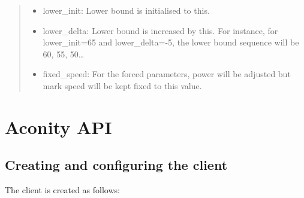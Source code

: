 \documentclass[letterpaper,10pt,english,openany,oneside]{sphinxmanual}
\begin{document}
\begin{itemize}
\begin{quote}
\begin{itemize}
\begin{itemize}
\item {} 
lower\_init: Lower bound is initialised to this.

\item {} 
lower\_delta: Lower bound is increased by this. For instance, for lower\_init=65 and lower\_delta=-5, the lower bound sequence will be 60, 55, 50…

\item {} 
fixed\_speed: For the forced parameters, power will be adjusted but mark speed will be kept fixed to this value.

\end{itemize}

\end{itemize}
\end{quote}

\end{itemize}


\chapter{Aconity API}
\label{\detokenize{aconityapi:aconity-api}}\label{\detokenize{aconityapi::doc}}

\section{Creating and configuring the client}
\label{\detokenize{aconityapi:creating-and-configuring-the-client}}
The client is created as follows:

\begin{sphinxVerbatim}[commandchars=\\\{\}]
   

  
    
    
    
    

   
\end{sphinxVerbatim}
\end{document}
